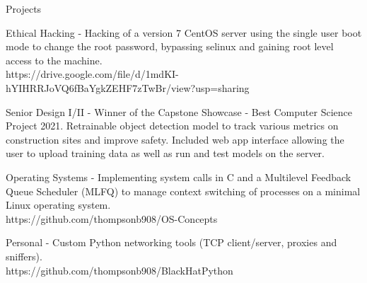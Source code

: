 \documentclass{resume} %
\begin{document}
\begin{rSection}{Projects}
	\item Ethical Hacking - Hacking of a version 7 CentOS server using the single user boot mode to change the root password, bypassing selinux and gaining root level access to the machine.\\https://drive.google.com/file/d/1mdKI-hYIHRRJoVQ6fBaYgkZEHF7zTwBr/view?usp=sharing
	\item Senior Design I/II - Winner of the Capstone Showcase - Best Computer Science Project 2021. Retrainable object detection model to track various metrics on construction sites and improve safety. Included web app interface allowing the user to upload training data as well as run and test models on the server.
	\item Operating Systems - Implementing system calls in C and a Multilevel Feedback Queue Scheduler (MLFQ) to manage context switching of processes on a minimal Linux operating system.\\
	https://github.com/thompsonb908/OS-Concepts
	\item Personal - Custom Python networking tools (TCP client/server, proxies and sniffers).\\https://github.com/thompsonb908/BlackHatPython
\end{rSection}

\end{document}
